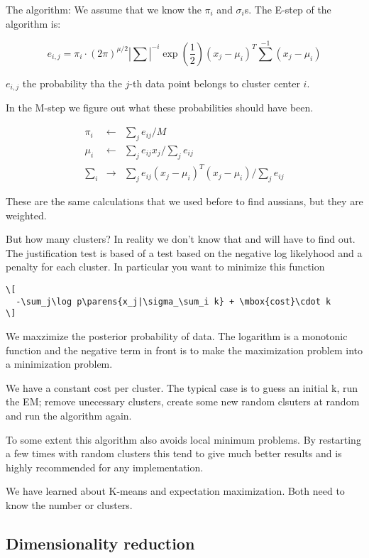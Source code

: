 \documentclass[a4, 12pt, english, USenglish]{scrreprt}
\newcommand{\parens}[1]{\ensuremath{\left({#1}\right)}}
\begin{document}
The algorithm:  We assume that we know the \(\pi_i\) and
\(\sigma_i\)s.   The E-step of the algorithm is:

\[
    e_{i,j} = \pi_i \cdot (2\pi)^{\mu/2}\left|\sum\right|^{-i} \exp\parens{\frac{1}{2}}\parens{x_j-\mu_i}^T{\sum}^{-1}\parens{x_j-\mu_i}
\]

\(e_{i,j}\) the probability tha the \(j\)-th data point belongs to
   cluster center \(i\). 

In the M-step we figure out what these probabilities should have been.

\[
\begin{array}{lcl}
  \pi_i &\leftarrow& \sum_j e_{ij}/M \\
 \mu_i &\leftarrow& \sum_j  e_{ij} x_j / \sum_je_{ij} \\
  \sum_i &\rightarrow& \sum_j  e_{ij}(x_j - \mu_i)^T(x_j-\mu_i) /
  \sum_j e_{ij}
\end{array}
\]

These are the same calculations that we used before to find aussians,
but they are weighted.

But how many clusters? In reality we don't know that and will have to
find out.    The justification test is based of a test based on the
negative log likelyhood and a penalty for each cluster.  In particular
you want to minimize this function

\begin{verbatim}
\[
  -\sum_j\log p\parens{x_j|\sigma_\sum_i k} + \mbox{cost}\cdot k
\]
\end{verbatim}

We maxzimize the posterior probability of data.  The logarithm is a
monotonic function and the negative term in front is to make the
maximization problem into a minimization problem.  

We have a constant cost per cluster.  The typical case is to guess an
initial k, run the EM; remove unecessary clusters, create some new
random clsuters at random and run the algorithm again.

To some extent this algorithm also avoids local minimum problems.  By
restarting a few times with random clusters this tend to give much
better results and is highly recommended for any implementation.

We have learned about K-means and expectation maximization.
Both need to know the number or clusters.

\subsection{Dimensionality reduction}
\end{document}
